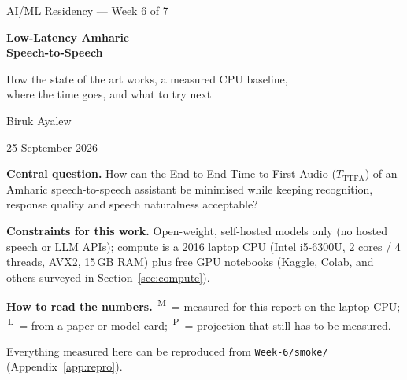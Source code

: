 \documentclass[11pt,a4paper]{article}
\newcommand{\meas}{\textsuperscript{\sffamily\color{good}\,M}}   %
\newcommand{\lit}{\textsuperscript{\sffamily\color{ink2}\,L}}    %
\newcommand{\proj}{\textsuperscript{\sffamily\color{warnc}\,P}}  %
\newcommand{\ttfa}{\ensuremath{T_{\mathrm{TTFA}}}}
\begin{document}
\begin{titlepage}
\sffamily
\vspace*{1.5cm}
{\color{ink2}\large AI/ML Residency — Week 6 of 7\par}
\vspace{0.4cm}
{\color{ink}\fontsize{26}{31}\selectfont\bfseries Low-Latency Amharic\\[2pt] Speech-to-Speech\par}
\vspace{0.3cm}
{\color{ink2}\Large How the state of the art works, a measured CPU baseline,\\ where the time goes, and what to try next\par}
\vspace{1.2cm}
{\color{ink}\large Biruk Ayalew\par}
{\color{ink2} 25 September 2026\par}
\vspace{1.4cm}
\begin{keybox}
\rmfamily
\textbf{Central question.} How can the End-to-End Time to First Audio (\ttfa) of an Amharic
speech-to-speech assistant be minimised while keeping recognition, response quality and
speech naturalness acceptable?\par\smallskip
\textbf{Constraints for this work.} Open-weight, self-hosted models only (no hosted speech or LLM APIs);
compute is a 2016 laptop CPU (Intel i5-6300U, 2 cores / 4 threads, AVX2, 15\,GB RAM) plus free GPU notebooks
(Kaggle, Colab, and others surveyed in Section~\ref{sec:compute}).\par\smallskip
\textbf{How to read the numbers.} \meas\ = measured for this report on the laptop CPU;
\lit\ = from a paper or model card; \proj\ = projection that still has to be measured.
\end{keybox}
\vfill
{\color{ink2}\small Everything measured here can be reproduced from \texttt{Week-6/smoke/} (Appendix~\ref{app:repro}).\par}
\end{titlepage}

\tableofcontents
\clearpage















\appendix

\end{document}
